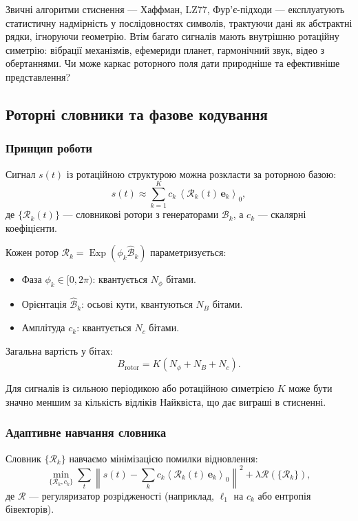 \documentclass[11pt,a4paper]{article}
\newcommand{\grade}[2]{\left\langle #1 \right\rangle_{#2}}
\newcommand{\scal}[1]{\grade{#1}{0}}
\newcommand{\Exp}{\operatorname{Exp}}
\newcommand{\Rotor}{\mathcal{R}}
\newcommand{\Biv}{\mathcal{B}}
\theoremstyle{definition}
\theoremstyle{plain}
\theoremstyle{remark}
\begin{document}
Звичні алгоритми стиснення — Хаффман, LZ77, Фур’є-підходи — експлуатують статистичну надмірність у послідовностях символів, трактуючи дані як абстрактні рядки, ігноруючи геометрію. Втім багато сигналів мають внутрішню ротаційну симетрію: вібрації механізмів, ефемериди планет, гармонічний звук, відео з обертаннями. Чи може каркас роторного поля дати природніше та ефективніше представлення?

\subsection{Роторні словники та фазове кодування}

\subsubsection{Принцип роботи}

Сигнал $s(t)$ із ротаційною структурою можна розкласти за роторною базою:
\begin{equation}
s(t) \approx \sum_{k=1}^K c_k \,\scal{\Rotor_k(t)\, \mathbf{e}_k},
\end{equation}
де $\{\Rotor_k(t)\}$ — словникові ротори з генераторами $\Biv_k$, а $c_k$ — скалярні коефіцієнти.

Кожен ротор $\Rotor_k = \Exp(\phi_k \hat{\Biv}_k)$ параметризується:
\begin{itemize}
  \item Фаза $\phi_k \in [0, 2\pi)$: квантується $N_\phi$ бітами.
  \item Орієнтація $\hat{\Biv}_k$: осьові кути, квантуються $N_B$ бітами.
  \item Амплітуда $c_k$: квантується $N_c$ бітами.
\end{itemize}

Загальна вартість у бітах:
\begin{equation}
B_{\text{rotor}} = K(N_\phi + N_B + N_c).
\end{equation}

Для сигналів із сильною періодикою або ротаційною симетрією $K$ може бути значно меншим за кількість відліків Найквіста, що дає виграші в стисненні.

\subsubsection{Адаптивне навчання словника}

Словник $\{\Rotor_k\}$ навчаємо мінімізацією помилки відновлення:
\begin{equation}
\min_{\{\Rotor_k, c_k\}} \sum_t \left\|s(t) - \sum_k c_k \scal{\Rotor_k(t)\, \mathbf{e}_k}\right\|^2 + \lambda \mathcal{R}(\{\Rotor_k\}),
\end{equation}
де $\mathcal{R}$ — регуляризатор розрідженості (наприклад, $\ell_1$ на $c_k$ або ентропія бівекторів).
\end{document}
